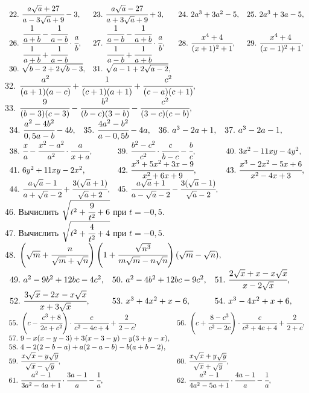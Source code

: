 \documentclass[12pt]{article}
\begin{document}
$\begin{array}{llll}
22.\ \cfrac{a\sqrt{a}+27}{a-3\sqrt{a}+9}-3,&
23.\ \cfrac{a\sqrt{a}-27}{a+3\sqrt{a}+9}+3,&
24.\ 2a^3+3a^2-5,&
25.\ 2a^3+3a-5,\\
26.\ \cfrac{\cfrac{1}{a+b}-\cfrac{1}{a-b}}{\cfrac{1}{a+b}+\cfrac{1}{a-b}}\cdot\cfrac{a}{b},&
27.\ \cfrac{\cfrac{1}{a-b}-\cfrac{1}{a+b}}{\cfrac{1}{a-b}+\cfrac{1}{a+b}}\cdot\cfrac{a}{b},&
28.\ \cfrac{x^4+4}{(x+1)^2+1},&
29.\ \cfrac{x^4+4}{(x-1)^2+1},\\
30.\ \sqrt{b-2+2\sqrt{b-3}},&
31.\ \sqrt{a-1+2\sqrt{a-2}},
\end{array}$\\
32. $\cfrac{a^2}{(a+1)(a-c)}+\cfrac{1}{(c+1)(a+1)}+\cfrac{c^2}{(c-a)(c+1)},$\\
33. $\cfrac{9}{(b-3)(c-3)}-\cfrac{b^2}{(b-c)(3-b)}-\cfrac{c^2}{(3-c)(c-b)},$\\
$\begin{array}{llll}
34.\ \cfrac{a^2-4b^2}{0,5a-b}-4b,&
35.\ \cfrac{4a^2-b^2}{a-0,5b}-4a,&
36.\ a^3-2a+1,&
37.\ a^3-2a-1,\end{array}$\\ $\begin{array}{lll}
38.\ \cfrac{x}{a}-\cfrac{x^2-a^2}{a^2}\cdot\cfrac{a}{x+a},&
39.\ \cfrac{b^2-c^2}{c^2}\cdot\cfrac{c}{b-c}-\cfrac{b}{c},&
40.\ 3x^2-11xy-4y^2,\\
41.\ 6y^2+11xy-2x^2,&
42.\ \cfrac{x^3+5x^2+3x-9}{x^2+6x+9},&
43.\ \cfrac{x^3-2x^2-5x+6}{x^2-4x+3},\\
44.\ \cfrac{a\sqrt{a}-1}{a+\sqrt{a}-2}+\cfrac{3(\sqrt{a}+1)}{\sqrt{a}+2},&
45.\ \cfrac{a\sqrt{a}+1}{a-\sqrt{a}-2}-\cfrac{3(\sqrt{a}-1)}{\sqrt{a}-2},
\end{array}$\\
46. Вычислить $\sqrt{t^2+\cfrac{9}{t^2}+6}$ при $t=-0,5.$\\
47. Вычислить $\sqrt{t^2+\cfrac{4}{t^2}+4}$ при $t=-0,5.$\\
48. $\left(\sqrt{m}+\cfrac{n}{\sqrt{m}+\sqrt{n}}\right)\left(1+\cfrac{\sqrt{n^3}}{m\sqrt{m}-n\sqrt{n}}\right)(
\sqrt{m}-\sqrt{n}),$\\
$\begin{array}{llll}
49.\ a^2-9b^2+12bc-4c^2,&
50.\ a^2-4b^2+12bc-9c^2,&
51.\ \cfrac{2\sqrt{x}+x-x\sqrt{x}}{x-2\sqrt{x}},\\
52.\ \cfrac{3\sqrt{x}-2x-x\sqrt{x}}{x+3\sqrt{x}},&
53.\ x^3+4x^2+x-6,&
54.\ x^3-4x^2+x+6,\end{array}$\\ $\begin{array}{ll}
55.\ \left(c-\cfrac{c^3+8}{2c+c^2}\right)\cdot\cfrac{c}{c^2-4c+4}+\cfrac{2}{2-c},&
56.\ \left(c+\cfrac{8-c^3}{c^2-2c}\right)\cdot\cfrac{c}{c^2+4c+4}+\cfrac{2}{2+c},\\
57.\ 9-x(x-y-3)+3(x-3-y)-y(3+y-x),\\
58.\ 4-2(2-b-a)+a(2-a-b)-b(a+b-2),\\
59.\ \cfrac{x\sqrt{x}-y\sqrt{y}}{\sqrt{x}-\sqrt{y}},&
60.\ \cfrac{x\sqrt{x}+y\sqrt{y}}{\sqrt{x}+\sqrt{y}},\\
61.\ \cfrac{a^2-1}{3a^2-4a+1}\cdot\cfrac{3a-1}{a}-\cfrac{1}{a},&
62.\ \cfrac{a^2-1}{4a^2-5a+1}\cdot\cfrac{4a-1}{a}-\cfrac{1}{a},
\end{array}$\\
\end{document}
